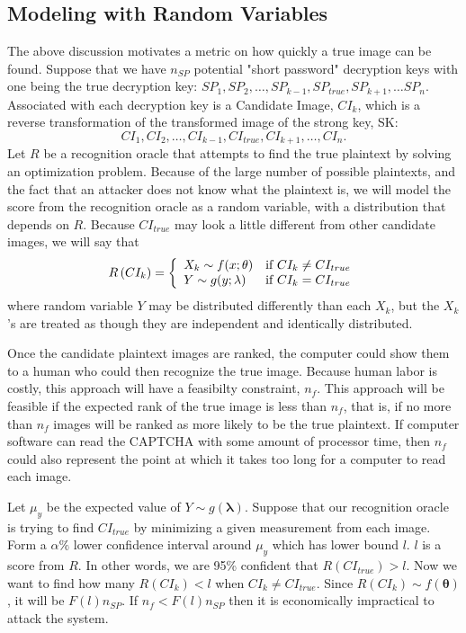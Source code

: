 \documentclass[12pt]{article}
\begin{document}
\subsection*{Modeling with Random Variables}
The above discussion motivates a metric on how quickly a true image can be found. Suppose that we have $n_{SP}$ potential "short password" decryption keys with one being the true decryption key: 
$SP_1, SP_2, \ldots, SP_{k-1}, SP_{true}, SP_{k+1}, \ldots SP_n$.
Associated with each decryption key is a Candidate Image, $CI_k$, which is a reverse transformation of the transformed image of the strong key, SK:
$$CI_1, CI_2, \ldots, CI_{k-1}, CI_{true}, CI_{k+1}, \ldots, CI_n.$$
Let $R$ be a recognition oracle that attempts to find the true plaintext by solving an optimization problem. Because of the large number of possible plaintexts, and the fact that an attacker does not know what the plaintext is, we will model the score from the recognition oracle as a random variable, with a distribution that depends on $R$. Because $CI_{true}$ may look a little different from other candidate images, we will say that
\begin{displaymath}
   R\left(CI_k\right) = \left\{
     \begin{array}{lr}
       X_k \sim f(x; \mathbf{\theta}) & \hbox{if } CI_k \neq CI_{true}\\
       Y \sim g(y; \mathbf{\lambda}) & \hbox{if } CI_k = CI_{true}
     \end{array}
   \right.
\end{displaymath}
where random variable $Y$ may be distributed differently than each $X_k$, but the $X_k$'s are treated as though they are independent and identically distributed.

Once the candidate plaintext images are ranked, the computer could show them to a human who could then recognize the true image. Because human labor is costly, this approach will have a feasibilty constraint, $n_f$. This approach will be feasible if the expected rank of the true image is less than $n_f$, that is, if no more than $n_f$ images will be ranked as more likely to be the true plaintext. If computer software can read the CAPTCHA with some amount of processor time, then $n_f$ could also represent the point at which it takes too long for a computer to read each image.

Let $\mu_y$ be the expected value of $Y \sim g(\mathbf{\lambda})$. Suppose that our recognition oracle is trying to find $CI_{true}$ by minimizing a given measurement from each image. Form a $\alpha\%$ lower confidence interval around $\mu_y$ which has lower bound $l$. $l$ is a score from $R$. In other words, we are 95\% confident that $R(CI_{true}) > l$. Now we want to find how many $R(CI_k) < l$ when $CI_k \neq CI_{true}$. Since $R\left(CI_k\right) \sim f(\mathbf{\theta})$, it will be $F(l) n_{SP}$. If $n_f < F(l) n_{SP}$ then it is economically impractical to attack the system.
\end{document}

